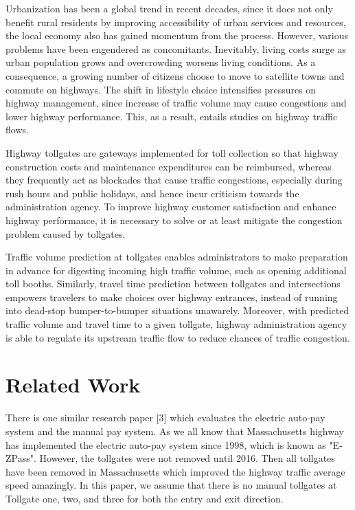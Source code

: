 \documentclass[journal, letterpaper]{IEEEtran}
\begin{document}
Urbanization has been a global trend in recent decades, since it does not only benefit rural residents by improving accessibility of urban services and resources, the local economy also has gained momentum from the process. However, various problems have been engendered as concomitants. Inevitably, living costs surge as urban population grows and overcrowding worsens living conditions. As a consequence, a growing number of citizens choose to move to satellite towns and commute on highways. The shift in lifestyle choice intensifies pressures on highway management, since increase of traffic volume may cause congestions and lower highway performance. This, as a result, entails studies on highway traffic flows.

Highway tollgates are gateways implemented for toll collection so that highway construction costs and maintenance expenditures can be reimbursed, whereas they frequently act as blockades that cause traffic congestions, especially during rush hours and public holidays, and hence incur criticism towards the administration agency. To improve highway customer satisfaction and enhance highway performance, it is necessary to solve or at least mitigate the congestion problem caused by tollgates.  

Traffic volume prediction at tollgates enables administrators to make preparation in advance for digesting incoming high traffic volume, such as opening additional toll booths. Similarly, travel time prediction between tollgates and intersections empowers travelers to make choices over highway entrances, instead of running into dead-stop bumper-to-bumper situations unawarely. Moreover, with predicted traffic volume and travel time to a given tollgate, highway administration agency is able to regulate its upstream traffic flow to reduce chances of traffic congestion.

\section{Related Work}
\large
There is one similar research paper [3] which evaluates the electric auto-pay system and the manual pay system. As we all know that Massachusetts highway has implemented the electric auto-pay system since 1998, which is known as "E-ZPass". However, the tollgates were not removed until 2016. Then all tollgates have been removed in Massachusetts which improved the highway traffic average speed amazingly. In this paper, we assume that there is no manual tollgates at Tollgate one, two, and three for both the entry and exit direction. 
\end{document}
